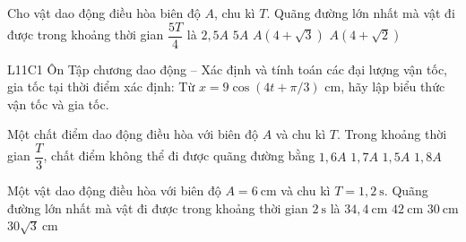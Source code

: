 \begin{ex}
Cho vật dao động điều hòa biên độ $A$, chu kì $T$. Quãng đường lớn nhất mà vật đi được trong khoảng thời gian $\dfrac{5T}{4}$ là
\choice
{$2{,}5A$}
{$5A$}
{$A(4+\sqrt{3})$}
{\True $A(4+\sqrt{2})$}
\end{ex}

\begin{ex}
L11C1 Ôn Tập chương dao động – Xác định và tính toán các đại lượng vận tốc, gia tốc tại thời điểm xác định: Từ $x=9\cos(4t+\pi/3)$ cm, hãy lập biểu thức vận tốc và gia tốc.
\choiceTF

\end{ex}

\begin{ex}
Một chất điểm dao động điều hòa với biên độ $A$ và chu kì $T$. Trong khoảng thời gian $\dfrac{T}{3}$, chất điểm không thể đi được quãng đường bằng
\choice
{$1{,}6A$}
{$1{,}7A$}
{$1{,}5A$}
{\True $1{,}8A$}
\end{ex}

\begin{ex}
Một vật dao động điều hòa với biên độ $A=6\ \text{cm}$ và chu kì $T=1,2\ \text{s}$. Quãng đường lớn nhất mà vật đi được trong khoảng thời gian $2\ \text{s}$ là
\choice
{$34,4\ \text{cm}$}
{\True $42\ \text{cm}$}
{$30\ \text{cm}$}
{$30\sqrt{3}\ \text{cm}$}
\end{ex}

